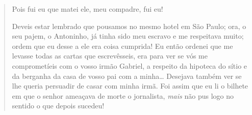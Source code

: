 {

\begin{quote}
Pois fui eu que matei ele, meu compadre, fui eu!
\smallskip

\noindent{}Deveis estar lembrado que pousamos no mesmo hotel em São Paulo;
ora, o seu pajem, o Antoninho, já tinha sido meu escravo e me
respeitava muito; ordem que eu desse a ele era coisa cumprida!
Eu então ordenei que me levasse todas as cartas que
escrevêsseis, era para ver se vós me comprometíeis com
o vosso irmão Gabriel, a respeito da hipoteca do sítio e da
berganha da casa de vosso pai com a minha\ldots{} Desejava
também ver se lhe queria persuadir de casar com minha
irmã. Foi assim que eu li o bilhete em que o senhor ameaçava de morte o
jornalista, \emph{mais} não pus logo no sentido o que depois
sucedeu!


\end{quote}}
